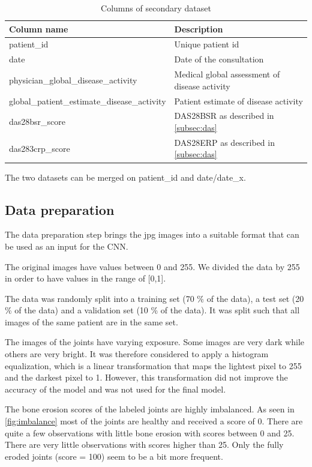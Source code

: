 \documentclass[12pt]{article}
\begin{document}
\begin{table}[ht]
\centering
\caption{Columns of secondary dataset}
\label{tab:sec_dataset}
\begin{tabular}{@{}ll@{}}
\toprule
Column name   & Description                                           \\ \midrule
patient\_id   & Unique patient id                                     \\
date       & Date of the consultation                              \\
physician\_global\_disease\_activity       & Medical global assessment of disease activity                \\
global\_patient\_estimate\_disease\_activity     & Patient estimate of disease activity   \\
das28bsr\_score    & DAS28BSR as described in \autoref{subsec:das}             \\
das283crp\_score & DAS28ERP as described in \autoref{subsec:das} \\ \bottomrule
\end{tabular}
\end{table}

The two datasets can be merged on patient\_id and date/date\_x.


\subsection{Data preparation}
\label{subsec:data_prep}

The data preparation step brings the jpg images into a suitable format that can be used as an input for the CNN. 

The original images have values between 0 and 255. We divided the data by 255 in order to have values in the range of [0,1].

The data was randomly split into a training set (70 \% of the data), a test set (20 \% of the data) and a validation set (10 \% of the data). It was split such that all images of the same patient are in the same set.

The images of the joints have varying exposure. Some images are very dark while others are very bright. It was therefore considered to apply a histogram equalization, which is a linear transformation that maps the lightest pixel to 255 and the darkest pixel to 1. However, this transformation did not improve the accuracy of the model and was not used for the final model.

The bone erosion scores of the labeled joints are highly imbalanced. As seen in \autoref{fig:imbalance} most of the joints are healthy and received a score of 0. There are quite a few observations with little bone erosion with scores between 0 and 25. There are very little observations with scores higher than 25. Only the fully eroded joints (score = 100) seem to be a bit more frequent.
\end{document}
